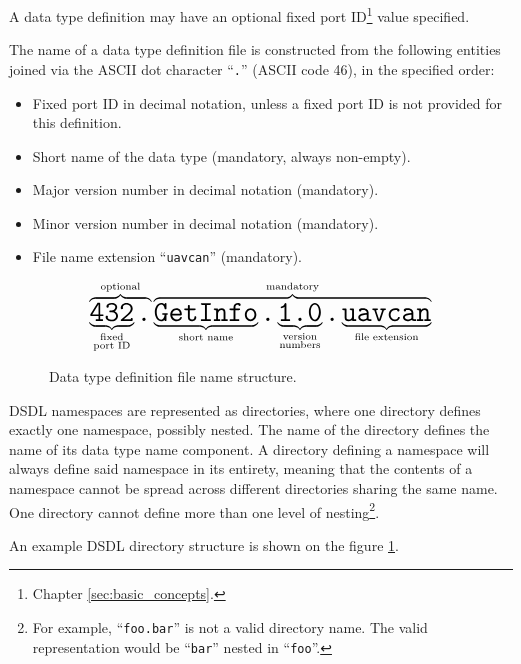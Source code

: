 A data type definition may have an optional fixed port ID\footnote{Chapter \ref{sec:basic_concepts}.} value specified.

The name of a data type definition file is constructed from the following entities
joined via the ASCII dot character ``\verb|.|'' (ASCII code 46), in the specified order:
\begin{itemize}
    \item Fixed port ID in decimal notation, unless a fixed port ID is not provided for this definition.
    \item Short name of the data type (mandatory, always non-empty).
    \item Major version number in decimal notation (mandatory).
    \item Minor version number in decimal notation (mandatory).
    \item File name extension ``\verb|uavcan|'' (mandatory).
\end{itemize}

\begin{figure}[H]
    $$
    \overbrace{%
        \underbrace{\texttt{\huge{432}}}_{\substack{\text{fixed} \\ \text{port ID}}}%
        \texttt{\huge{.}}%
    }^{\text{optional}}%
    \overbrace{%
        \underbrace{\texttt{\huge{GetInfo}}}_{\substack{\text{short name}}}%
        \texttt{\huge{.}}%
        \underbrace{\texttt{\huge{1.0}}}_{\substack{\text{version} \\ \text{numbers}}}%
        \texttt{\huge{.}}%
        \underbrace{\texttt{\huge{uavcan}}}_{\text{file extension}}%
    }^{\text{mandatory}}
    $$
    \caption{Data type definition file name structure.\label{fig:dsdl_definition_file_name_structure}}
\end{figure}

DSDL namespaces are represented as directories, where one directory defines exactly one namespace, possibly nested.
The name of the directory defines the name of its data type name component.
A directory defining a namespace will always define said namespace in its entirety,
meaning that the contents of a namespace cannot be spread across different directories sharing the same name.
One directory cannot define more than one level of
nesting\footnote{For example, ``\texttt{foo.bar}'' is not a valid directory name.
The valid representation would be ``\texttt{bar}'' nested in ``\texttt{foo}''.}.

An example DSDL directory structure is shown on the figure \ref{fig:dsdl_definition_file_name_structure}.

